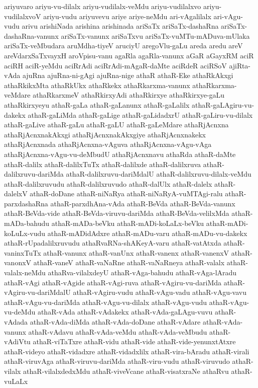 {ariyuvaro
ariyu-vu-dilalx
ariyu-vudilalx-veMdu
ariyu-vudilalxvo
ariyu-vudilalxvoV
ariyu-vudu
ariyuvevu
ariye
ariye-neMdu
ari-vAgalilalx
ari-vAgu-vudu
arivu
arishiNada
arishina
arishinada
ariSaTx
ariSaTx-dashaRna
ariSaTx-dashaRna-vanunx
ariSaTx-vanunx
ariSaTxvu
ariSaTx-vuMTu-mADuva-mUlaka
ariSaTx-veMbudara
aruMdha-tiyeV
aruciyU
aregoVlu-gaLu
areda
aredu
areV
areVdarxSaTxvayxH
aroVpisu-vanu
agaRla
agaRla-vanunx
aGaR
aGayxRM
aciR
aciRH
aciR-yeMdu
aciRrAdi
aciRrAdi-mAgaR-daMte
aciRdeR
aciRSoV
ajiRta-vAda
ajuRna
ajuRna-ni-gAgi
ajuRna-nige
athaR
athaR-Eke
athaRkAkxgi
athaRkikxMta
athaRkUkx
athaRkekx
athaRkarxma-vanunx
athaRkarxma-veMdare
athaRkarxmeV
athaRkirxyAdi
athaRkirxye
athaRkirxye-gaLu
athaRkirxyeyu
athaR-gaLa
athaR-gaLanunx
athaR-gaLalilx
athaR-gaLAgiru-vu-dakekx
athaR-gaLiMda
athaR-gaLige
athaR-gaLidadxrU
athaR-gaLiru-vu-dilalx
athaR-gaLive
athaR-gaLu
athaR-gaLU
athaR-gaLeMdare
athaRjAcnxna
athaRjAcnxnakAkxgi
athaRjAcnxnakAkxgiye
athaRjAcnxnakekx
athaRjAcnxnada
athaRjAcnxna-vAguva
athaRjAcnxna-vAgu-vAga
athaRjAcnxna-vAgu-vu-deMbudU
athaRjAcnxnavu
athaRda
athaR-daMte
athaR-dalilx
athaR-dalilxTuTx
athaR-dalilxde
athaR-dalilxruva
athaR-dalilxruvu-dariMda
athaR-dalilxruvu-dariMdalU
athaR-dalilxruvu-dilalx-veMdu
athaR-dalilxruvudu
athaR-dalilxruvudo
athaR-dalUlx
athaR-dalelx
athaR-dalelxV
athaR-doDane
athaR-niNaRya
athaR-niNaRyA-vuMTAgi-ralu
athaR-parxdashaRna
athaR-parxdhAna-vAda
athaR-BeVda
athaR-BeVda-vanunx
athaR-BeVda-vide
athaR-BeVda-viruvu-dariMda
athaR-BeVda-velilxMda
athaR-mADa-bahudu
athaR-mADa-beVku
athaR-mADi-koLaLx-beVku
athaR-mADi-koLuLx-vudu
athaR-mADidAdxre
athaR-mADu-varu
athaR-mADu-vu-dakekx
athaR-rUpadalilxruvudu
athaRvaRNa-shAKeyA-varu
athaR-vatAtxda
athaR-vaninxTuTx
athaR-vanunx
athaR-vanUnx
athaR-vanenx
athaR-vanenxV
athaR-vanonxV
athaR-vaneV
athaR-vaNaRne
athaR-vaNaRneya
athaR-valalx
athaR-valalx-neMdu
athaRva-vilalxdeyU
athaR-vAga-bahudu
athaR-vAga-lAradu
athaR-vAgi
athaR-vAgide
athaR-vAgi-ruva
athaR-vAgiru-vu-dariMda
athaR-vAgiru-vu-dariMdalU
athaR-vAgiru-vudu
athaR-vAgu-vadu
athaR-vAgu-vavu
athaR-vAgu-vu-dariMda
athaR-vAgu-vu-dilalx
athaR-vAgu-vudu
athaR-vAgu-vu-deMdu
athaR-vAda
athaR-vAdakekx
athaR-vAda-gaLAgu-vuvu
athaR-vAdada
athaR-vAda-diMda
athaR-vAda-doDane
athaR-vAdare
athaR-vAda-vanunx
athaR-vAdavu
athaR-vAda-veMdu
athaR-vAda-veMbudu
athaR-vAdiVtu
athaR-viTaTxre
athaR-vidu
athaR-vide
athaR-vide-yenunxtAtxre
athaR-videyo
athaR-vidadxre
athaR-vidadxlilx
athaR-vira-bAradu
athaR-virali
athaR-viruvAga
athaR-viruvu-dariMda
athaR-viru-vudu
athaR-viruvudo
athaR-vilalx
athaR-vilalxdedxMdu
athaR-viveVcane
athaR-visatxraNe
athaRvu
athaR-vuLaLx
}
